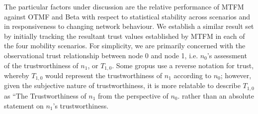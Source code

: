 \documentclass[runningheads,a4paper]{llncs}
\begin{document}
The particular factors under discussion are the relative performance of MTFM against OTMF and Beta with respect to statistical stability across scenarios and in responsiveness to changing network behaviour. 
We establish a similar result set by initially tracking the resultant trust values established by MTFM in each of the four mobility scenarios.
For simplicity, we are primarily concerned with the observational trust relationship between node 0 and node 1, i.e. $n_0$'s assessment of the trustworthiness of $n_1$, or $T_{1,0}$.
Some gropus use a reverse notation for trust, whereby $T_{1,0}$ would represent the trustworthiness of $n_1$ according to $n_0$; however, given the subjective nature of trustworthiness, it is more relatable to describe $T_{1,0}$ as ``The Trustworthiness of $n_1$ from the perspective of $n_0$. rather than an absolute statement on $n_1$'s trustworthiness.
\end{document}

